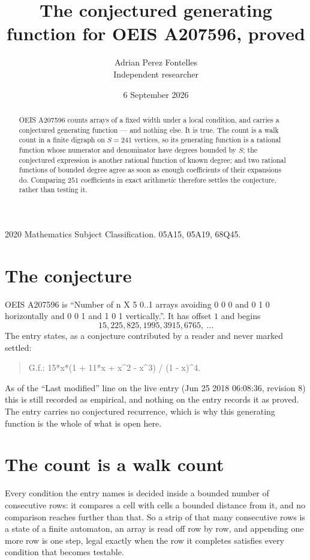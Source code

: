 \documentclass[11pt,a4paper]{article}
\title{The conjectured generating function for OEIS A207596, proved}
\author{Adrian Perez Fontelles\\ \small Independent researcher}
\date{6 September 2026}
\theoremstyle{plain}
\theoremstyle{definition}
\begin{document}
\maketitle

\begin{abstract}
OEIS A207596 counts arrays of a fixed width under a local condition, and carries a conjectured
generating function --- and nothing else. It is true. The count is a walk count in a finite
digraph on $S=241$ vertices, so its generating function is a rational function whose numerator
and denominator have degrees bounded by $S$; the conjectured expression is another rational
function of known degree; and two rational functions of bounded degree agree as soon as enough
coefficients of their expansions do. Comparing $251$ coefficients in exact arithmetic
therefore settles the conjecture, rather than testing it.
\end{abstract}

\noindent\small 2020 Mathematics Subject Classification. 05A15, 05A19, 68Q45.\normalsize

\section{The conjecture}

OEIS A207596 is ``Number of n X 5 0..1 arrays avoiding 0 0 0 and 0 1 0 horizontally and 0 0 1 and 1 0 1 vertically.''. It has offset $1$ and begins
\[
15, 225, 825, 1995, 3915, 6765,\ \dots
\]
The entry states, as a conjecture contributed by a reader and never marked settled:
\begin{quote}
G.f.: 15*x*(1 + 11*x + x\^{}2 - x\^{}3) / (1 - x)\^{}4.
\end{quote}
As of the ``Last modified'' line on the live entry (Jun 25 2018 06:08:36, revision 8) this is still
recorded as empirical, and nothing on the entry records it as proved. The entry carries no
conjectured recurrence, which is why this generating function is the whole of what is open
here.

\section{The count is a walk count}

Every condition the entry names is decided inside a bounded number of consecutive rows: it
compares a cell with cells a bounded distance from it, and no comparison reaches further than
that. So a strip of that many consecutive rows is a state of a finite automaton, an array is
read off row by row, and appending one more row is one step, legal exactly when the row it
completes satisfies every condition that becomes testable.
\end{document}
